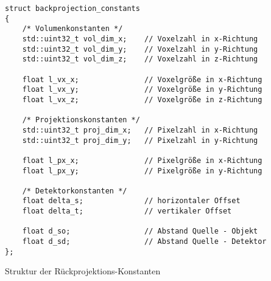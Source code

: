 \begin{code}
\begin{verbatim}
struct backprojection_constants
{
    /* Volumenkonstanten */
    std::uint32_t vol_dim_x;    // Voxelzahl in x-Richtung
    std::uint32_t vol_dim_y;    // Voxelzahl in y-Richtung
    std::uint32_t vol_dim_z;    // Voxelzahl in z-Richtung

    float l_vx_x;               // Voxelgröße in x-Richtung
    float l_vx_y;               // Voxelgröße in y-Richtung
    float l_vx_z;               // Voxelgröße in z-Richtung

    /* Projektionskonstanten */
    std::uint32_t proj_dim_x;   // Pixelzahl in x-Richtung
    std::uint32_t proj_dim_y;   // Pixelzahl in y-Richtung

    float l_px_x;               // Pixelgröße in x-Richtung
    float l_px_y;               // Pixelgröße in y-Richtung

    /* Detektorkonstanten */
    float delta_s;              // horizontaler Offset
    float delta_t;              // vertikaler Offset

    float d_so;                 // Abstand Quelle - Objekt
    float d_sd;                 // Abstand Quelle - Detektor
};
\end{verbatim}
\caption{Struktur der Rückprojektions-Konstanten}
\label{app:fdk_consts}
\end{code}

